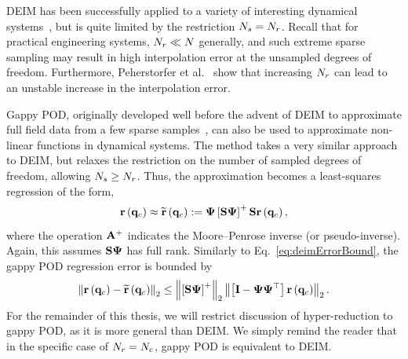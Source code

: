 DEIM has been successfully applied to a variety of interesting dynamical systems~\cite{Chaturantabut2011, Henneron2014}, but is quite limited by the restriction $N_s = N_r$. Recall that for practical engineering systems, $N_r \ll N$ generally, and such extreme sparse sampling may result in high interpolation error at the unsampled degrees of freedom. Furthermore, Peherstorfer et al.~\cite{Peherstorfer2020} show that increasing $N_r$ can lead to an unstable increase in the interpolation error.

Gappy POD, originally developed well before the advent of DEIM to approximate full field data from a few sparse samples~\cite{Everson1995}, can also be used to approximate non-linear functions in dynamical systems. The method takes a very similar approach to DEIM, but relaxes the restriction on the number of sampled degrees of freedom, allowing $N_s \ge N_r$. Thus, the approximation becomes a least-squares regression of the form,
%
\begin{equation}\label{eq:gappyPODRHSApprox}
    \resFunc{\consVec} \approx \resApproxFunc{\consVec} \defEq \deimBasis \left[ \sampMat \deimBasis \right]^{+} \sampMat \resFunc{\consVec},
\end{equation}
%
where the operation $\mathbf{A}^+$ indicates the Moore--Penrose inverse (or pseudo-inverse). Again, this assumes $\sampMat \deimBasis$ has full rank. Similarly to Eq.~\ref{eq:deimErrorBound}, the gappy POD regression error is bounded by
%
\begin{equation}\label{eq:gappyPODErrorBound}
    \left\Vert \resFunc{\consVec} - \resApproxFunc{\consVec} \right\Vert_2 \le \left\Vert \left[ \sampMat \deimBasis \right]^{+} \right\Vert_2 \left\Vert \left[ \identMat - \deimBasis \deimBasis^\top \right] \resFunc{\consVec} \right\Vert_2.
\end{equation}
%
For the remainder of this thesis, we will restrict discussion of hyper-reduction to gappy POD, as it is more general than DEIM. We simply remind the reader that in the specific case of $N_r = N_c$, gappy POD is equivalent to DEIM.

